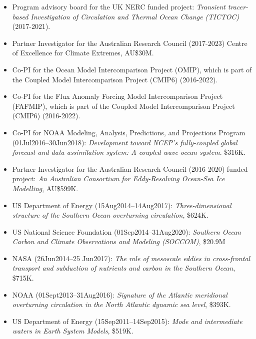 \documentclass{article}
\begin{document}
\begin{itemize}[leftmargin=*]
\item Program advisory board for the UK NERC funded project: {\it Transient tracer-based Investigation of Circulation and Thermal Ocean Change (TICTOC)} (2017-2021).

\item Partner Investigator for the Australian Research Council (2017-2023) Centre of Excellence for Climate Extremes, AU\$30M.
  
\item Co-PI for the Ocean Model Intercomparison Project (OMIP), which is part of the Coupled Model Intercomparison Project (CMIP6) (2016-2022).    

\item Co-PI for the Flux Anomaly Forcing Model Intercomparison Project (FAFMIP), which is part of the Coupled Model Intercomparison Project (CMIP6) (2016-2022).    

\item Co-PI for NOAA Modeling, Analysis, Predictions, and Projections Program (01Jul2016--30Jun2018): {\it Development toward NCEP's fully-coupled global forecast and data assimilation system: A coupled wave-ocean system}.  \$316K.

\item Partner Investigator for the  Australian Research Council (2016-2020) funded project: {\it An Australian Consortium for Eddy-Resolving Ocean-Sea Ice Modelling}, AU\$599K.

\item US Department of Energy (15Aug2014--14Aug2017): {\it Three-dimensional structure of the Southern Ocean overturning circulation},  \$624K.

\item US National Science Foundation (01Sep2014--31Aug2020): {\it Southern Ocean Carbon and Climate Observations and Modeling (SOCCOM)}, \$20.9M

\item NASA (26Jun2014--25 Jun2017): {\it The role of mesoscale eddies in cross-frontal transport and subduction of nutrients and carbon in the Southern Ocean}, \$715K.

\item NOAA (01Sept2013--31Aug2016): {\it Signature of the Atlantic meridional overturning circulation in the North Atlantic dynamic sea level}, \$393K.

\item US Department of Energy (15Sep2011--14Sep2015): {\it Mode and intermediate waters in Earth System Models}, \$519K.


\end{itemize}
\end{document}

